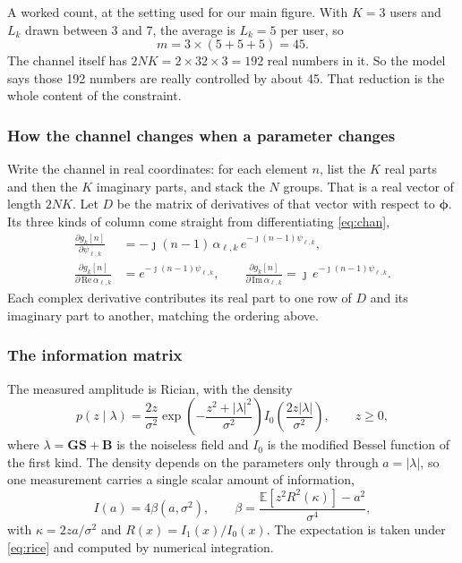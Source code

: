 \documentclass[journal]{IEEEtran}
\newcommand{\bG}{\mathbf{G}}
\newcommand{\bS}{\mathbf{S}}
\newcommand{\bB}{\mathbf{B}}
\begin{document}
A worked count, at the setting used for our main figure. With $K=3$ users and
$L_k$ drawn between 3 and 7, the average is $L_k=5$ per user, so
\begin{equation}
m=3\times(5+5+5)=45 .
\end{equation}
The channel itself has $2NK=2\times32\times3=192$ real numbers in it. So the
model says those 192 numbers are really controlled by about 45. That reduction
is the whole content of the constraint.

\subsubsection{How the channel changes when a parameter changes}

Write the channel in real coordinates: for each element $n$, list the $K$ real
parts and then the $K$ imaginary parts, and stack the $N$ groups. That is a
real vector of length $2NK$. Let $D$ be the matrix of derivatives of that
vector with respect to $\boldsymbol\phi$. Its three kinds of column come
straight from differentiating \eqref{eq:chan},
\begin{align}
\frac{\partial g_k[n]}{\partial\psi_{\ell,k}}
&=-\jmath(n-1)\,\alpha_{\ell,k}\,e^{-\jmath(n-1)\psi_{\ell,k}},
\label{eq:jac}\\
\frac{\partial g_k[n]}{\partial\,\mathrm{Re}\,\alpha_{\ell,k}}
&=e^{-\jmath(n-1)\psi_{\ell,k}},
\qquad
\frac{\partial g_k[n]}{\partial\,\mathrm{Im}\,\alpha_{\ell,k}}
=\jmath\,e^{-\jmath(n-1)\psi_{\ell,k}} .
\nonumber
\end{align}
Each complex derivative contributes its real part to one row of $D$ and its
imaginary part to another, matching the ordering above.

\subsubsection{The information matrix}

The measured amplitude is Rician, with the density
\begin{equation}
p(z\mid\lambda)=\frac{2z}{\sigma^2}
\exp\!\left(-\frac{z^2+|\lambda|^2}{\sigma^2}\right)
I_0\!\left(\frac{2z|\lambda|}{\sigma^2}\right),
\qquad z\ge0,
\label{eq:rice}
\end{equation}
where $\lambda=\bG\bS+\bB$ is the noiseless field and $I_0$ is the modified
Bessel function of the first kind. The density depends on the parameters only
through $a=|\lambda|$, so one measurement carries a single scalar amount of
information,
\begin{equation}
I(a)=4\beta(a,\sigma^2),
\qquad
\beta=\frac{\mathbb{E}\!\left[z^2R^2(\kappa)\right]-a^2}{\sigma^4},
\label{eq:beta}
\end{equation}
with $\kappa=2za/\sigma^2$ and $R(x)=I_1(x)/I_0(x)$. The expectation is taken
under \eqref{eq:rice} and computed by numerical integration.
\end{document}
